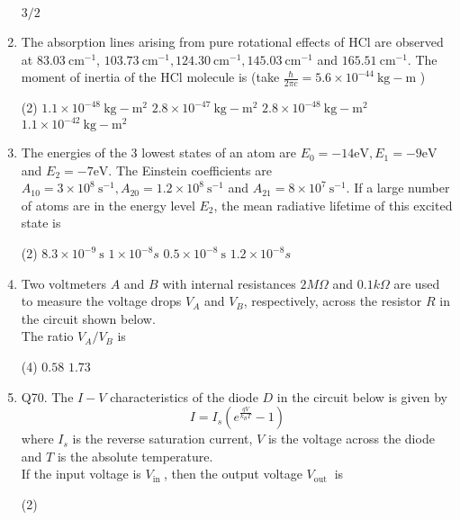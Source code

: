 \begin{enumerate}
\begin{tasks}
	\task[\textbf{d.}] $3 / 2$
\end{tasks}
\item  The absorption lines arising from pure rotational effects of $\mathrm{HCl}$ are observed at $83.03 \mathrm{~cm}^{-1}$, $103.73 \mathrm{~cm}^{-1}, 124.30 \mathrm{~cm}^{-1}, 145.03 \mathrm{~cm}^{-1}$ and $165.51 \mathrm{~cm}^{-1}$. The moment of inertia of the $\mathrm{HCl}$ molecule is (take $\frac{\hbar}{2 \pi c}=5.6 \times 10^{-44} \mathrm{~kg}-\mathrm{m}$ )
 \begin{tasks}(2)
	\task[\textbf{a.}] $1.1 \times 10^{-48} \mathrm{~kg}-\mathrm{m}^{2}$
	\task[\textbf{b.}]$2.8 \times 10^{-47} \mathrm{~kg}-\mathrm{m}^{2}$
	\task[\textbf{c.}]$2.8 \times 10^{-48} \mathrm{~kg}-\mathrm{m}^{2}$
	\task[\textbf{d.}] $1.1 \times 10^{-42} \mathrm{~kg}-\mathrm{m}^{2}$
\end{tasks}
\item  The energies of the 3 lowest states of an atom are $E_{0}=-14 \mathrm{eV}, E_{1}=-9 \mathrm{eV}$ and $E_{2}=-7 \mathrm{eV}$. The Einstein coefficients are $A_{10}=3 \times 10^{8} \mathrm{~s}^{-1}, A_{20}=1.2 \times 10^{8} \mathrm{~s}^{-1}$ and $A_{21}=8 \times 10^{7} \mathrm{~s}^{-1}$. If a large number of atoms are in the energy level $E_{2}$, the mean radiative lifetime of this excited state is
 \begin{tasks}(2)
	\task[\textbf{a.}] $8.3 \times 10^{-9} \mathrm{~s}$
	\task[\textbf{b.}]$1 \times 10^{-8} s$
	\task[\textbf{c.}]$0.5 \times 10^{-8} \mathrm{~s}$
	\task[\textbf{d.}]$1.2 \times 10^{-8} s$ 
\end{tasks}
\item  Two voltmeters $A$ and $B$ with internal resistances $2 M \Omega$ and $0.1 k \Omega$ are used to measure the voltage drops $V_{A}$ and $V_{B}$, respectively, across the resistor $R$ in the circuit shown below.\\
The ratio $V_{A} / V_{B}$ is
 \begin{tasks}(4)
	\task[\textbf{a.}]$0.58$
	\task[\textbf{b.}] $1.73$
\end{tasks}
\item Q70. The $I-V$ characteristics of the diode $D$ in the circuit below is given by
$$
I=I_{s}\left(e^{\frac{q V}{k_{B} T}}-1\right)
$$
where $I_{s}$ is the reverse saturation current, $V$ is the voltage across the diode and $T$ is the absolute temperature.\\
If the input voltage is $V_{\text {in }}$, then the output voltage $V_{\text {out }}$ is
 \begin{tasks}(2)

\end{tasks}
\end{enumerate}
